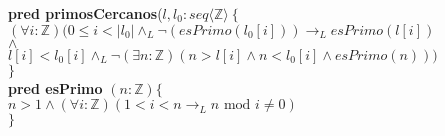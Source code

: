 \documentclass[a4paper]{article}
\begin{document}
			\textbf{pred primosCercanos}($l,l_0: seq\langle\mathbb{Z}\rangle
			\ \{$\smallskip \\
			\hspace*{6mm}$(\forall i:\mathbb{Z})(0\leq i<|l_0|\wedge_L\neg(esPrimo(l_0[i]))
			\rightarrow_L esPrimo(l[i])$\\
			\hspace*{6mm}$\wedge $\\
			\hspace*{6mm}$l[i]<l_0[i]\wedge_L \neg(\exists n:\mathbb{Z})(n>l[i]\wedge
			n<l_0[i]\wedge esPrimo(n)))$\\
			\hspace*{5mm}$\}$\smallskip \\
			
			\textbf{pred esPrimo} $(n: \mathbb{Z})\{$\\ 
			\hspace*{6mm}$ n > 1 \wedge(\forall i :\mathbb{Z})
			(1<i<n \rightarrow _L n\textrm{ mod }i\neq 0 )$\\
			\hspace*{5mm}$\}$\smallskip \\
\end{document}
